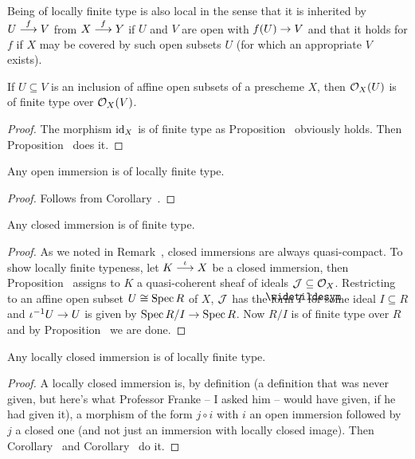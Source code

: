 \documentclass[a4paper,parskip=half,numbers=enddot, DIV=12]{scrreprt}
\begin{document}
\begin{rem*}
    Being of locally finite type is also local in the sense that it is inherited by $U\morphism[f] V$ from $X\morphism[f] Y$ if $U$ and $V$ are open with $f(U)\morphism V$ and that it holds for $f$ if $X$ may be covered by such open subsets $U$ (for which an appropriate $V$ exists).
\end{rem*}
\begin{cor}
    If $U\subseteq V$ is an inclusion of affine open subsets of a prescheme $X$, then $\mathcal{O}_X(U)$ is of finite type over $\mathcal{O}_X(V)$.
\end{cor}
\begin{proof}
	The morphism $\operatorname{id}_X$ is of finite type as Proposition~ obviously holds. Then Proposition~ does it.
\end{proof}
\begin{cor}
    Any open immersion is of locally finite type. 
\end{cor}
\begin{proof}
	Follows from Corollary~.
\end{proof}
\begin{cor}
    Any closed immersion is of finite type.
\end{cor}
\begin{proof}
	As we noted in Remark~, closed immersions are always quasi-compact. To show locally finite typeness, let $K\morphism[\iota]X$ be a closed immersion, then Proposition~ assigns to $K$ a quasi-coherent sheaf of ideals $\mathcal{J}\subseteq\mathcal{O}_X$. Restricting to an affine open subset $U\cong\operatorname{Spec} R$ of $X$, $\mathcal{J}$ has the form $\snake I$ for some ideal $I\subseteq R$ and $\iota^{-1}U\morphism U$ is given by $\Spec R/I\morphism\Spec R$. Now $R/I$ is of finite type over $R$ and by Proposition~ we are done.
\end{proof}
\begin{cor}
    Any locally closed immersion is of locally finite type.
\end{cor}
\begin{proof}
	A locally closed immersion is, by definition (a definition that was never given, but here's what Professor Franke -- I asked him -- would have given, if he had given it), a morphism of the form $j\circ i$ with $i$ an open immersion followed by $j$ a closed one (and not just an immersion with locally closed image). Then Corollary~ and Corollary~ do it. 
\end{proof}
\end{document}
